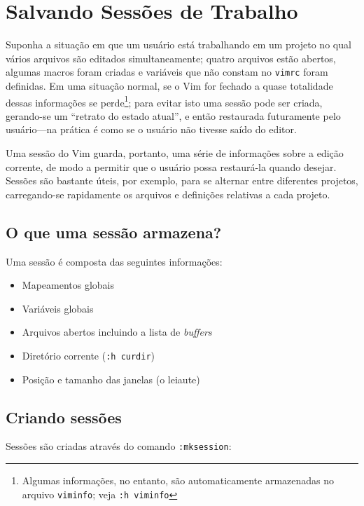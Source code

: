 \documentclass[10pt,a4paper,openany]{book}
\begin{document}
\chapter{Salvando Sessões de Trabalho}
\label{cha:Salvando Sessões de Trabalho}

Suponha a situação em que um usuário está trabalhando em um projeto no qual
vários arquivos são editados simultaneamente; quatro arquivos estão abertos,
algumas macros foram criadas e variáveis que não constam no \verb|vimrc| foram
definidas. Em uma situação normal, se o Vim for fechado a quase totalidade
dessas informações se perde\footnote{Algumas informações, no entanto, são
automaticamente armazenadas no arquivo {\tt viminfo}; veja {\tt :h viminfo} }; 
para evitar isto uma sessão pode ser criada, gerando-se um
``retrato do estado atual'', e então restaurada futuramente pelo
usuário---na prática é como se o usuário não tivesse saído do editor. 

Uma sessão do Vim guarda, portanto, uma série de informações sobre a edição
corrente, de modo a permitir que o usuário possa restaurá-la quando desejar.
Sessões são bastante úteis, por exemplo, para se alternar entre diferentes
projetos, carregando-se rapidamente os arquivos e definições relativas a cada
projeto.

\section{O que uma sessão armazena?}

Uma sessão é composta das seguintes informações:

\begin{itemize}
 \item Mapeamentos globais
 \item Variáveis globais
 \item Arquivos abertos incluindo a lista de {\it buffers}
 \item Diretório corrente ({\tt :h curdir})
 \item Posição e tamanho das janelas (o leiaute) 
\end{itemize}

\section{Criando sessões}
\label{sec:Criando sessões}

Sessões são criadas através do comando \verb|:mksession|:
\end{document}
